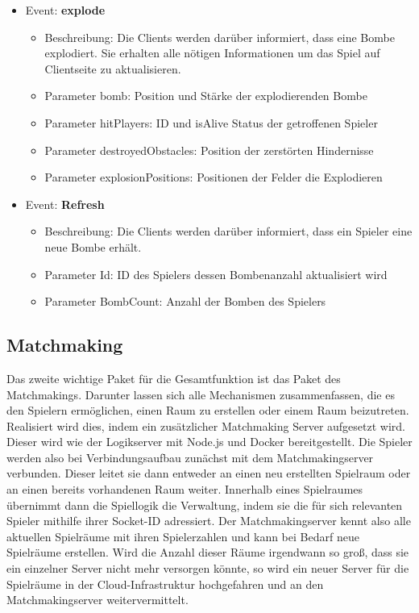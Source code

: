 \documentclass[conference]{IEEEtran}
\begin{document}
\begin{itemize}
\begin{itemize}
\end{itemize}

\item Event: \textbf{explode}
\begin{itemize}
\item Beschreibung:
    Die Clients werden darüber informiert, dass eine Bombe explodiert. Sie erhalten alle nötigen Informationen um das Spiel auf Clientseite zu aktualisieren.
    
\item Parameter \glqq bomb\grqq{}: Position und Stärke der explodierenden Bombe
\item Parameter \glqq hitPlayers\grqq{}: ID und isAlive Status der getroffenen Spieler
\item Parameter \glqq destroyedObstacles\grqq{}: Position der zerstörten Hindernisse
\item Parameter \glqq explosionPositions\grqq{}: 
Positionen der Felder die Explodieren
\end{itemize}

\item Event: \textbf{Refresh}
\begin{itemize}
\item Beschreibung:
    Die Clients werden darüber informiert, dass ein Spieler eine neue Bombe erhält.
    
\item Parameter \glqq Id\grqq{}: ID des Spielers dessen Bombenanzahl aktualisiert wird
\item Parameter \glqq BombCount\grqq{}: Anzahl der Bomben des Spielers
\end{itemize}

\end{itemize}
\smallskip

\subsection{Matchmaking}
Das zweite wichtige Paket für die Gesamtfunktion ist das Paket des Matchmakings. Darunter lassen sich alle Mechanismen zusammenfassen, die es den Spielern ermöglichen, einen Raum zu erstellen oder einem Raum beizutreten. Realisiert wird dies, indem ein zusätzlicher Matchmaking Server aufgesetzt wird. Dieser wird wie der Logikserver mit Node.js und Docker bereitgestellt. Die Spieler werden also bei Verbindungsaufbau zunächst mit dem Matchmakingserver verbunden. Dieser leitet sie dann entweder an einen neu erstellten Spielraum oder an einen bereits vorhandenen Raum weiter. Innerhalb eines Spielraumes übernimmt dann die Spiellogik die Verwaltung, indem sie die für sich relevanten Spieler mithilfe ihrer Socket-ID adressiert. Der Matchmakingserver kennt also alle aktuellen Spielräume mit ihren Spielerzahlen und kann bei Bedarf neue Spielräume erstellen. Wird die Anzahl dieser Räume irgendwann so groß, dass sie ein einzelner Server nicht mehr versorgen könnte, so wird ein neuer Server für die Spielräume in der Cloud-Infrastruktur hochgefahren und an den Matchmakingserver weitervermittelt.
\end{document}

